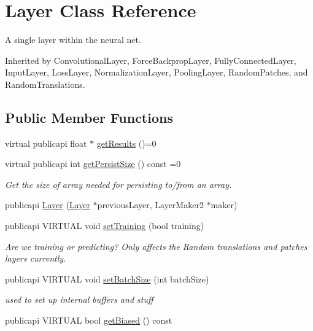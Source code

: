\hypertarget{classLayer}{\section{Layer Class Reference}
\label{classLayer}
}


A single layer within the neural net.  




Inherited by Convolutional\-Layer, Force\-Backprop\-Layer, Fully\-Connected\-Layer, Input\-Layer, Loss\-Layer, Normalization\-Layer, Pooling\-Layer, Random\-Patches, and Random\-Translations.

\subsection*{Public Member Functions}
\begin{DoxyCompactItemize}
\item 
virtual publicapi float $\ast$ \hyperlink{classLayer_ae9068e8ff8f6d8d50412aa82014562a7}{get\-Results} ()=0
\item 
virtual publicapi int \hyperlink{classLayer_a8ad13f9abd9accb3577cec64172c3cfa}{get\-Persist\-Size} () const =0
\begin{DoxyCompactList}\small\item\em Get the size of array needed for persisting to/from an array. \end{DoxyCompactList}\item 
publicapi \hyperlink{classLayer_af8926e30054e50a5c7d1b29a8be05164}{Layer} (\hyperlink{classLayer}{Layer} $\ast$previous\-Layer, Layer\-Maker2 $\ast$maker)
\item 
publicapi V\-I\-R\-T\-U\-A\-L void \hyperlink{classLayer_ae4347df6631ca9af22de31d3d1c1273d}{set\-Training} (bool training)
\begin{DoxyCompactList}\small\item\em Are we training or predicting? Only affects the Random translations and patches layers currently. \end{DoxyCompactList}\item 
publicapi V\-I\-R\-T\-U\-A\-L void \hyperlink{classLayer_a9779cba6c042648fcce1c605e4bed3b8}{set\-Batch\-Size} (int batch\-Size)
\begin{DoxyCompactList}\small\item\em used to set up internal buffers and stuff \end{DoxyCompactList}\item 
publicapi V\-I\-R\-T\-U\-A\-L bool \hyperlink{classLayer_ab79827404ddcc0748363ee82f80f5500}{get\-Biased} () const 

\end{DoxyCompactItemize}
